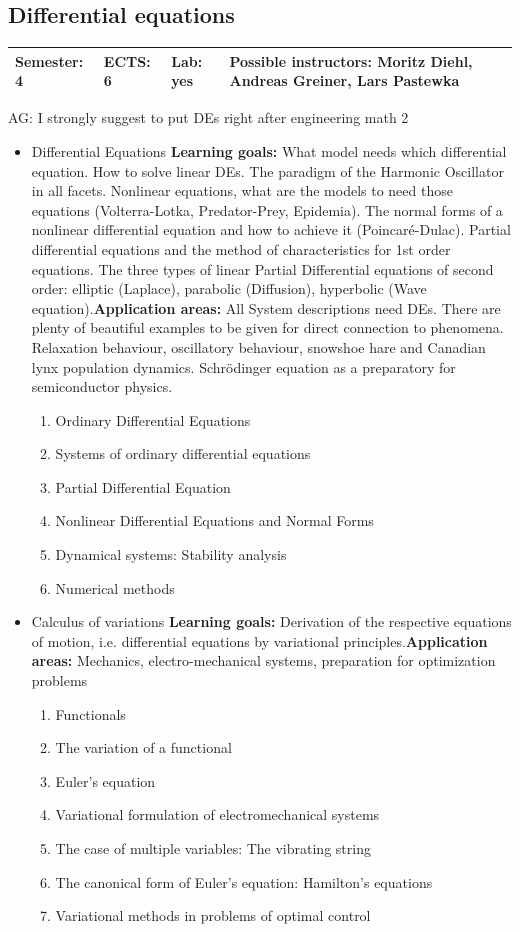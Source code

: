 \documentclass[12pt,twoside,fleqn,a4paper]{article}
\newcommand{\ag}[1]{{\color{blue}AG: #1}}  %
\newcommand{\goalapps}[2]{\newline\textbf{Learning goals:} #1\newline\textbf{Application areas:} #2}
\begin{document}
\subsection{Differential equations}
\begin{tabular}{llll} \hline
\textbf{Semester:} 4 & \textbf{ECTS:} 6 & \textbf{Lab:} yes & \textbf{Possible instructors:} Moritz Diehl, Andreas Greiner, Lars Pastewka \\
\hline
\end{tabular}
%
\ag{I strongly suggest to put DEs right after engineering math 2}
\begin{itemize}
\setlength\itemsep{0cm}
\item Differential Equations
\goalapps{What model needs which differential equation. How to solve linear DEs. The paradigm of the Harmonic Oscillator in all facets. Nonlinear equations, what are the models to need those equations (Volterra-Lotka, Predator-Prey, Epidemia). The normal forms of a nonlinear differential equation and how to achieve it (Poincaré-Dulac). Partial differential equations and the method of characteristics for 1st order equations. The three types of linear Partial Differential equations of second order: elliptic (Laplace), parabolic (Diffusion), hyperbolic (Wave equation).}{All System descriptions need DEs. There are plenty of beautiful examples to be given for direct connection to phenomena. Relaxation behaviour, oscillatory behaviour, snowshoe hare and Canadian lynx population dynamics. Schrödinger equation as a preparatory for semiconductor physics.}
\begin{enumerate}
    \item Ordinary Differential Equations
    \item Systems of ordinary differential equations
    \item Partial Differential Equation
    \item Nonlinear Differential Equations and Normal Forms
    \item Dynamical systems: Stability analysis
    \item Numerical methods
\end{enumerate}
\item Calculus of variations
\goalapps{Derivation of the respective equations of motion, i.e. differential equations by variational principles.}{Mechanics, electro-mechanical systems, preparation for optimization problems}
\begin{enumerate}
    \item Functionals
    \item The variation of a functional
    \item Euler's equation
    \item Variational formulation of electromechanical systems
    \item The case of multiple variables: The vibrating string
    \item The canonical form of Euler's equation: Hamilton's equations
    \item Variational methods in problems of optimal control
\end{enumerate}


\end{itemize}
\end{document}
